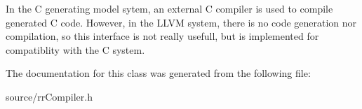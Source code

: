 In the C generating model sytem, an external C compiler is used to compile generated C code. However, in the L\-L\-V\-M system, there is no code generation nor compilation, so this interface is not really usefull, but is implemented for compatiblity with the C system. 

The documentation for this class was generated from the following file\-:\begin{DoxyCompactItemize}
\item 
source/rr\-Compiler.\-h\end{DoxyCompactItemize}
